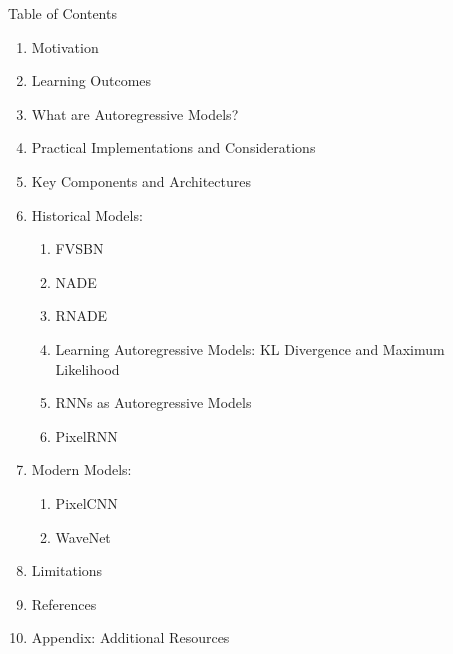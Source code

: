 \begin{frame}[allowframebreaks]{Table of Contents}
\begin{enumerate}
    \item Motivation
    \item Learning Outcomes
    \item What are Autoregressive Models?
    \item Practical Implementations and Considerations
    \item Key Components and Architectures
    \item Historical Models:
    \begin{enumerate}
        \item FVSBN
        \item NADE
        \item RNADE
        \item Learning Autoregressive Models: KL Divergence and Maximum Likelihood
        \item RNNs as Autoregressive Models
        \item PixelRNN
    \end{enumerate}
    \item Modern Models: 
    \begin{enumerate} 
        \item PixelCNN
        \item WaveNet
    \end{enumerate}
    \item Limitations
    \item References
    \item Appendix: Additional Resources
\end{enumerate}
\end{frame}